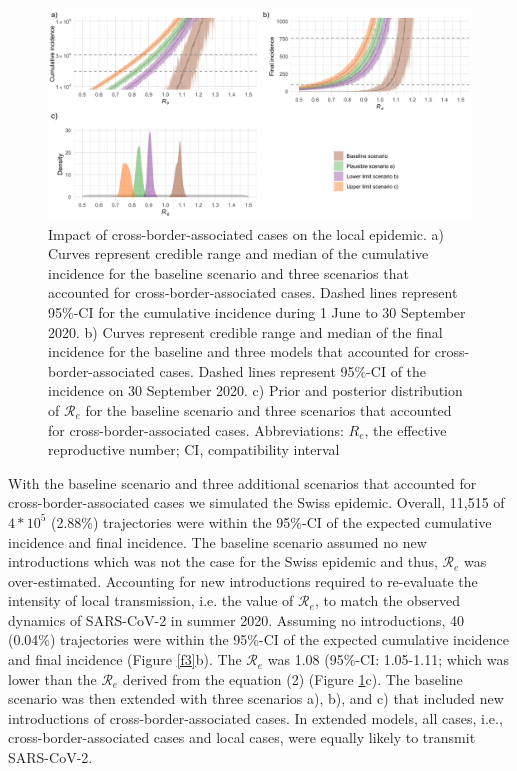 \documentclass[10pt, a4paper, twoside]{article}
\begin{document}
\begin{multicols}{2}
\begin{figure}
\centering
\includegraphics[scale=0.15]{Figure2_2021-06-02.png}
\caption{Impact of cross-border-associated cases on the local epidemic.
a) Curves represent credible range and median of the cumulative incidence for the baseline scenario and three scenarios that accounted for cross-border-associated cases.
Dashed lines represent 95\%-CI for the cumulative incidence during 1 June to 30 September 2020.
b) Curves represent credible range and median of the final incidence for the baseline and three models that accounted for cross-border-associated cases.
Dashed lines represent 95\%-CI of the incidence on 30 September 2020.
c) Prior and posterior distribution of $\mathcal{R}_e$ for the baseline scenario and three scenarios that accounted for cross-border-associated cases.
Abbreviations: $R_e$, the effective reproductive number; CI, compatibility interval}

\label{f2}
\end{figure}

With the baseline scenario and three additional scenarios that accounted for cross-border-associated cases we simulated the Swiss epidemic.
Overall, 11,515 of $4*10^5$ (2.88\%) trajectories were within the 95\%-CI of the expected cumulative incidence and final incidence.
The baseline scenario assumed no new introductions which was not the case for the Swiss epidemic and thus, $\mathcal{R}_e$ was over-estimated.
Accounting for new introductions required to re-evaluate the intensity of local transmission, i.e. the value of $\mathcal{R}_e$, to match the observed dynamics of SARS-CoV-2 in summer 2020.
Assuming no introductions, 40 (0.04\%) trajectories were within the 95\%-CI of the expected cumulative incidence and final incidence (Figure \ref{f3}b).
The $\mathcal{R}_e$ was 1.08 (95\%-CI: 1.05-1.11; which was lower than the $\mathcal{R}_e$ derived from the equation (2) (Figure \ref{f2}c).
The baseline scenario was then extended with three scenarios a), b), and c) that included new introductions of cross-border-associated cases.
In extended models, all cases, i.e., cross-border-associated cases and local cases, were equally likely to transmit SARS-CoV-2.


\end{multicols}
\end{document}
